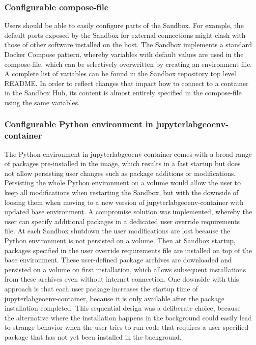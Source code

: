 \documentclass[11pt, a4paper, oneside, parskip=full-]{scrartcl}
\begin{document}
\subsubsection*{Configurable compose-file}
Users should be able to easily configure parts of the Sandbox. For
example, the default ports exposed by the Sandbox for external connections might
clash with those of other software installed on the host. The Sandbox implements
a standard Docker Compose pattern, whereby variables with default values are
used in the compose-file, which can be selectively overwritten by creating an
environment file\cite{composeenvfile}. A complete list of variables can be found
in the Sandbox repository top level README\cite{osgissandbox}. In order to
reflect changes that impact how to connect to a container in the Sandbox Hub,
its content is almost entirely specified in the compose-file using the same
variables.

\subsubsection*{Configurable Python environment in jupyterlabgeoenv-container}
The Python environment in jupyterlabgeoenv-container comes with a broad range of
packages pre-installed in the image, which results in a fast startup but does
not allow persisting user changes such as package additions or modifications.
Persisting the whole Python environment on a volume would allow the user to keep
all modifications when restarting the Sandbox, but with the downside of loosing
them when moving to a new version of jupyterlabgeoenv-container with updated
base environment. A compromise solution was implemented, whereby the user can
specify additional packages in a dedicated user override requirements file. At
each Sandbox shutdown the user modifications are lost because the Python
environment is not persisted on a volume. Then at Sandbox startup, packages
specified in the user override requirements file are installed on top of the
base environment. These user-defined package archives are downloaded and
persisted on a volume on first installation, which allows subsequent
installations from these archives even without internet connection. One downside
with this approach is that each user package increases the startup time of
jupyterlabgeoenv-container, because it is only available after the package
installation completed. This sequential design was a deliberate choice, because
the alternative where the installation happens in the background could easily
lead to strange behavior when the user tries to run code that requires a user
specified package that has not yet been installed in the background.
\end{document}
